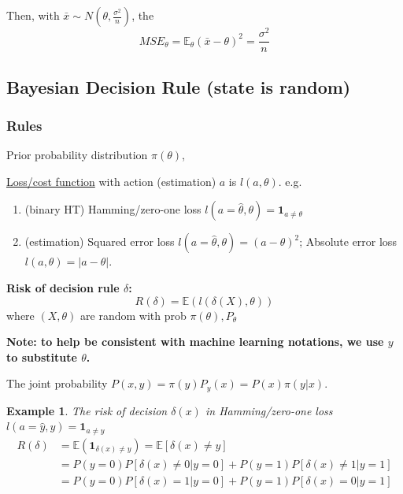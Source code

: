\documentclass[11pt,a4paper]{article}
\newtheorem{example}{Example}
\begin{document}
Then, with $\bar{x}\sim N(\theta,\frac{\sigma^2}{n})$, the $$MSE_\theta=\mathbb{E}_\theta\left(\bar{x}-\theta\right)^2=\frac{\sigma^2}{n}$$

\subsection{Bayesian Decision Rule (state is random)}
\subsubsection{Rules}
Prior probability distribution $\pi(\theta)$,

\underline{Loss/cost function} with action (estimation) $a$ is $l(a,\theta)$. e.g.
\begin{enumerate}
    \item (binary HT) Hamming/zero-one loss $l(a=\hat{\theta},\theta)=\mathbf{1}_{a\neq \theta}$
    \item (estimation) Squared error loss $l(a=\hat{\theta},\theta)=(a-\theta)^2$; Absolute error loss $l(a,\theta)=|a-\theta|$.
\end{enumerate}

\textbf{Risk of decision rule $\delta$:} $$R(\delta)=\mathbb{E}\left(l(\delta(X),\theta)\right)$$ where $(X,\theta)$ are random with prob $\pi(\theta),P_\theta$

\textbf{Note: to help be consistent with machine learning notations, we use $y$ to substitute $\theta$.}

The joint probability $P(x,y)=\pi(y)P_y(x)=P(x)\pi(y|x)$.

\begin{example}
    The risk of decision $\delta(x)$ in Hamming/zero-one loss $l(a=\hat{y},y)=\mathbf{1}_{a\neq y}$
    \begin{equation}
        \begin{aligned}
            R(\delta)&=\mathbb{E}(\mathbf{1}_{\delta(x)\neq y})=\mathbb{E}[\delta(x)\neq y]\\
            &=P(y=0)P[\delta(x)\neq 0|y=0]+P(y=1)P[\delta(x)\neq 1|y=1]\\
            &=P(y=0)P[\delta(x)=1|y=0]+P(y=1)P[\delta(x)=0|y=1]
        \end{aligned}
        \nonumber
    \end{equation}
\end{example}
\end{document}
